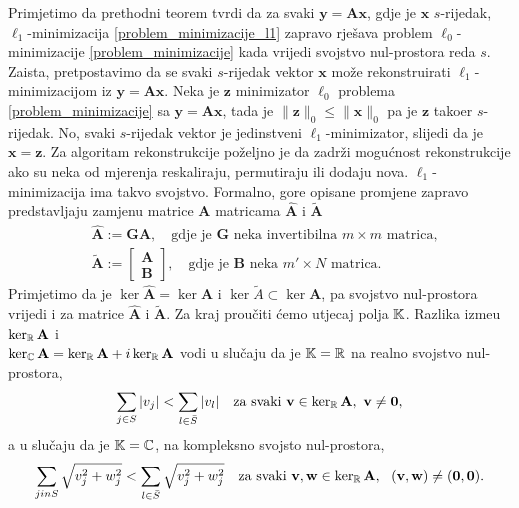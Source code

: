 \documentclass[a4paper,twoside,12pt]{memoir} %
\newcommand{\vect}[1]{\mathbf{#1}}
\renewcommand{\vec}{\vect}
\newcommand{\norm}[1]{\|{#1}\|}
\begin{document}
Primjetimo da prethodni teorem tvrdi da za svaki $\vec y = \vec{Ax}$, gdje je $\vec x$ $s$-rijedak, $\ell_1$-minimizacija \eqref{problem_minimizacije_l1} zapravo rje\v{s}ava problem $\ell_0$-minimizacije \eqref{problem_minimizacije} kada vrijedi svojstvo nul-prostora reda $s$. Zaista, pretpostavimo da se svaki $s$-rijedak vektor $\vec{x}$ mo\v{z}e rekonstruirati $\ell_1$-minimizacijom iz $\vec y = \vec{Ax}$. Neka je $\vec z$ minimizator $\ell_0$ problema \eqref{problem_minimizacije} sa $\vec y = \vec{Ax}$, tada je $\norm{\vec z}_0 \leq \norm{\vec x}_0$ pa je $\vec z$ tako\dj er $s$-rijedak. No, svaki $s$-rijedak vektor je jedinstveni $\ell_1$-minimizator, slijedi da je $\vec x = \vec z$.
\newline \indent
Za algoritam rekonstrukcije po\v{z}eljno je da zadr\v{z}i mogu\'cnost rekonstrukcije ako su neka od mjerenja reskaliraju, permutiraju ili dodaju nova. $\ell_1$-minimizacija ima takvo svojstvo. Formalno, gore opisane promjene zapravo predstavljaju zamjenu matrice $\vec A$ matricama $\vec{\hat A}$ i $\vec{\tilde A}$
\begin{align*}
    & \vec{\hat A} := \vec{GA}, \quad \text{gdje je }\vec{G}\text{ neka invertibilna }m \times m \text{ matrica},\\
    & \vec{\tilde A} := 
    \begin{bmatrix*}
        \vec A \\ \vec B
    \end{bmatrix*}
    , \quad \text{gdje je }\vec{B}\text{ neka }m' \times N \text{ matrica}.
\end{align*}
Primjetimo da je $\ker \vec{\hat A} = \ker \vec A$ i $\ker \tilde A \subset \ker \vec A$, pa svojstvo nul-prostora vrijedi i za matrice $\vec{\hat A}$ i $\vec{\tilde A}$.
\newline
\newline
\indent
Za kraj prou\v{c}iti \'cemo utjecaj polja $\mathbb{K}$. Razlika izme\dj u $\ker_{\R}\vec A$ i\\ $\ker_{\C} \vec A = \ker_{\R} \vec A + i \ker_{\R} \vec A$ vodi u slu\v{c}aju da je $\mathbb{K}=\mathbb{R}$ na realno svojstvo nul-prostora, 
\begin{equation}\label{svojstvo_nul_prostora_realno}
    \sum_{j \in S}|v_j| < \sum_{l \in \bar{S}}|v_l| \quad \text{za svaki } \vec v \in \ker_{\R} \vec A,\ \vec v \neq \vec 0,  
\end{equation}
a u slu\v{c}aju da je $\mathbb{K} = \mathbb{C}$, na kompleksno svojsto nul-prostora,
\begin{equation}\label{svojstvo_nul_prostora_kompleksno}
    \sum_{j in S}\sqrt{v_j^2 + w_j^2} < \sum_{l \in \bar{S}}\sqrt{v_j^2 + w_j^2}\quad \text{za svaki } \vec v, \vec w \in \ker_{\R} \vec A,\ \ ( \vec v, \vec w ) \neq \vec (\vec 0,\vec 0).  
\end{equation}
\end{document}
